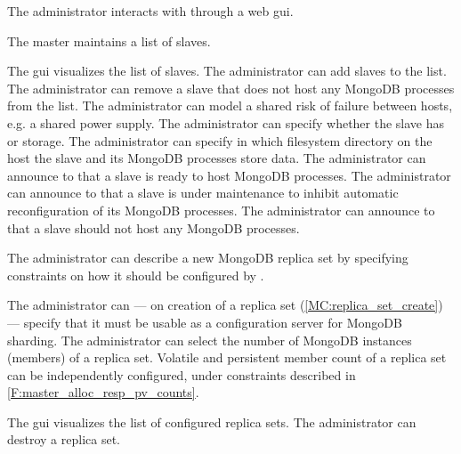 \begin{description}
	
	 The administrator interacts with \mamid through a web gui. \done
	
	 The master maintains a list of slaves. \done
	\begin{description}
		 The gui visualizes the list of slaves. \done
		 The administrator can add slaves to the list. \done
		 The administrator can remove a slave that does not host any MongoDB processes from the 
		list. \done
		 The administrator can model a shared risk of failure between hosts, e.g. a shared power 
		supply. \done
		 The administrator can specify whether the slave has  or  storage. \done
		 The administrator can specify in which filesystem directory on the host the slave 
		and its MongoDB processes store data. %
		 The administrator can announce to \mamid that a slave is ready to host MongoDB processes. 
		\done
		 The administrator can announce to \mamid that a slave is under maintenance to inhibit 
		automatic reconfiguration of its MongoDB processes. \done %
		 The administrator can announce to \mamid that a slave should not host any MongoDB processes. 
		\done
	\end{description}
	
	 The administrator can describe a new MongoDB \gls{replica set} by specifying constraints on 
	how it should be configured by \mamid. \done
	\begin{description}
		 The administrator can --- on creation of a \gls{replica set} 
		(\ref{MC:replica_set_create}) --- specify that it must be usable as a configuration server for MongoDB sharding. 
		\done
		 The administrator can select the number of MongoDB instances (members) of a 
		\gls{replica set}. \done
		 Volatile and persistent member count of a \gls{replica set} can be independently 
		configured, under constraints described in \ref{F:master_alloc_resp_pv_counts}. \done
	\end{description}
	 The gui visualizes the list of configured \glspl{replica set}. \done
	 The administrator can destroy a \gls{replica set}. \done
	
\end{description}


